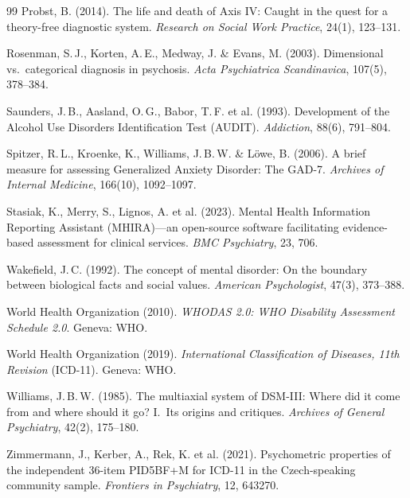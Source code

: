 \documentclass[11pt,a4paper]{article}
\begin{document}
\begin{thebibliography}{99}
Probst, B. (2014).
\newblock The life and death of Axis IV: Caught in the quest for a theory-free diagnostic system.
\newblock \textit{Research on Social Work Practice}, 24(1), 123--131.

Rosenman, S.\,J., Korten, A.\,E., Medway, J. \& Evans, M. (2003).
\newblock Dimensional vs.\ categorical diagnosis in psychosis.
\newblock \textit{Acta Psychiatrica Scandinavica}, 107(5), 378--384.

Saunders, J.\,B., Aasland, O.\,G., Babor, T.\,F. et al. (1993).
\newblock Development of the Alcohol Use Disorders Identification Test (AUDIT).
\newblock \textit{Addiction}, 88(6), 791--804.

Spitzer, R.\,L., Kroenke, K., Williams, J.\,B.\,W. \& L\"owe, B. (2006).
\newblock A brief measure for assessing Generalized Anxiety Disorder: The GAD-7.
\newblock \textit{Archives of Internal Medicine}, 166(10), 1092--1097.

Stasiak, K., Merry, S., Lignos, A. et al. (2023).
\newblock Mental Health Information Reporting Assistant (MHIRA)---an open-source software facilitating evidence-based assessment for clinical services.
\newblock \textit{BMC Psychiatry}, 23, 706.

Wakefield, J.\,C. (1992).
\newblock The concept of mental disorder: On the boundary between biological facts and social values.
\newblock \textit{American Psychologist}, 47(3), 373--388.

World Health Organization (2010).
\newblock \textit{WHODAS 2.0: WHO Disability Assessment Schedule 2.0}.
\newblock Geneva: WHO.

World Health Organization (2019).
\newblock \textit{International Classification of Diseases, 11th Revision} (ICD-11).
\newblock Geneva: WHO.

Williams, J.\,B.\,W. (1985).
\newblock The multiaxial system of DSM-III: Where did it come from and where should it go? I.\ Its origins and critiques.
\newblock \textit{Archives of General Psychiatry}, 42(2), 175--180.

Zimmermann, J., Kerber, A., Rek, K. et al. (2021).
\newblock Psychometric properties of the independent 36-item PID5BF+M for ICD-11 in the Czech-speaking community sample.
\newblock \textit{Frontiers in Psychiatry}, 12, 643270.

\end{thebibliography}
\end{document}
